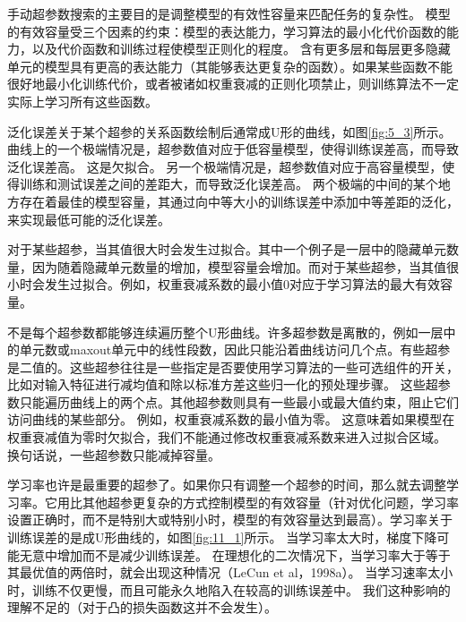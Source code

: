 手动超参数搜索的主要目的是调整模型的有效性容量来匹配任务的复杂性。 模型的有效容量受三个因素的约束：模型的表达能力，学习算法的最小化代价函数的能力，以及代价函数和训练过程使模型正则化的程度。 含有更多层和每层更多隐藏单元的模型具有更高的表达能力（其能够表达更复杂的函数）。如果某些函数不能很好地最小化训练代价，或者被诸如权重衰减的正则化项禁止，则训练算法不一定实际上学习所有这些函数。

泛化误差关于某个超参的关系函数绘制后通常成U形的曲线，如图\ref{fig:5_3}所示。曲线上的一个极端情况是，超参数值对应于低容量模型，使得训练误差高，而导致泛化误差高。 这是欠拟合。 另一个极端情况是，超参数值对应于高容量模型，使得训练和测试误差之间的差距大，而导致泛化误差高。 两个极端的中间的某个地方存在着最佳的模型容量，其通过向中等大小的训练误差中添加中等差距的泛化，来实现最低可能的泛化误差。

对于某些超参，当其值很大时会发生过拟合。其中一个例子是一层中的隐藏单元数量，因为随着隐藏单元数量的增加，模型容量会增加。而对于某些超参，当其值很小时会发生过拟合。例如，权重衰减系数的最小值0对应于学习算法的最大有效容量。

不是每个超参数都能够连续遍历整个U形曲线。许多超参数是离散的，例如一层中的单元数或maxout单元中的线性段数，因此只能沿着曲线访问几个点。有些超参是二值的。这些超参往往是一些指定是否要使用学习算法的一些可选组件的开关，比如对输入特征进行减均值和除以标准方差这些归一化的预处理步骤。 这些超参数只能遍历曲线上的两个点。其他超参数则具有一些最小或最大值约束，阻止它们访问曲线的某些部分。 例如，权重衰减系数的最小值为零。 这意味着如果模型在权重衰减值为零时欠拟合，我们不能通过修改权重衰减系数来进入过拟合区域。 换句话说，一些超参数只能减掉容量。

学习率也许是最重要的超参了。如果你只有调整一个超参的时间，那么就去调整学习率。它用比其他超参更复杂的方式控制模型的有效容量（针对优化问题，学习率设置正确时，而不是特别大或特别小时，模型的有效容量达到最高）。学习率关于训练误差的是成U形曲线的，如图\ref{fig:11_1}所示。 当学习率太大时，梯度下降可能无意中增加而不是减少训练误差。 在理想化的二次情况下，当学习率大于等于其最优值的两倍时，就会出现这种情况（LeCun et al，1998a）。 当学习速率太小时，训练不仅更慢，而且可能永久地陷入在较高的训练误差中。 我们这种影响的理解不足的（对于凸的损失函数这并不会发生）。

